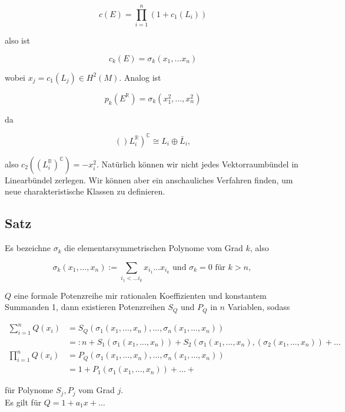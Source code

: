\documentclass[10pt, letterpaper]{article}
\begin{document}
$$
c(E)=\prod_{i=1}^{n}\left(1+c_{1}\left(L_{i}\right)\right)
$$

also ist

$$
c_{k}(E)=\sigma_{k}\left(x_{1}, \ldots x_{n}\right)
$$

wobei $x_{j}=c_{1}\left(L_{j}\right) \in H^{2}(M)$. Analog ist

$$
p_{k}\left(E^{\mathbb{R}}\right)=\sigma_{k}\left(x_{1}^{2}, \ldots, x_{n}^{2}\right)
$$

da

$$
\left.() L_{i}^{\mathbb{R}}\right)^{\mathbb{C}} \cong L_{i} \oplus \bar{L}_{i},
$$

also $c_{2}\left(\left(L_{i}^{\mathbb{R}}\right)^{\mathbb{C}}\right)=-x_{i}^{2}$. Natürlich können wir nicht jedes Vektorraumbündel in Linearbündel zerlegen. Wir können aber ein anschauliches Verfahren finden, um neue charakteristische Klassen zu definieren.

\subsection*{Satz}
Es bezeichne $\sigma_{k}$ die elementarsymmetrischen Polynome vom Grad $k$, also

$$
\sigma_{k}\left(x_{1}, \ldots, x_{n}\right):=\sum_{i_{1}<\ldots i_{k}} x_{i_{1}} \ldots x_{i_{k}} \text { und } \sigma_{k}=0 \text { für } k>n \text {, }
$$

$Q$ eine formale Potenzreihe mir rationalen Koeffizienten und konstantem Summanden 1, dann existieren Potenzreihen $S_{Q}$ und $P_{Q}$ in $n$ Variablen, sodass

$$
\begin{aligned}
\sum_{i=1}^{n} Q\left(x_{i}\right) & =S_{Q}\left(\sigma_{1}\left(x_{1}, \ldots, x_{n}\right), \ldots, \sigma_{n}\left(x_{1}, \ldots, x_{n}\right)\right) \\
& =: n+S_{1}\left(\sigma_{1}\left(x_{1}, \ldots, x_{n}\right)\right)+S_{2}\left(\sigma_{1}\left(x_{1}, \ldots, x_{n}\right),\left(\sigma_{2}\left(x_{1}, \ldots, x_{n}\right)\right)+\ldots\right. \\
\prod_{i=1}^{n} Q\left(x_{i}\right) & =P_{Q}\left(\sigma_{1}\left(x_{1}, \ldots, x_{n}\right), \ldots, \sigma_{n}\left(x_{1}, \ldots, x_{n}\right)\right) \\
& =1+P_{1}\left(\sigma_{1}\left(x_{1}, \ldots, x_{n}\right)\right)+\ldots+
\end{aligned}
$$

für Polynome $S_{j}, P_{j}$ vom Grad $j$.\\
Es gilt für $Q=1+a_{1} x+\ldots$
\end{document}
